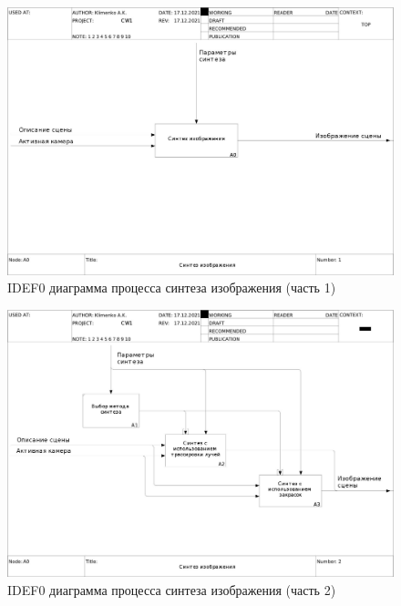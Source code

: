\begin{figure}[ht]
    \centering
    \includegraphics[width=\linewidth,height=0.85\textheight,keepaspectratio]{idef0/01_A0.jpg}
    \caption{IDEF0 диаграмма процесса синтеза изображения (часть 1)}
    \label{idef0:render:1}
\end{figure}

\begin{figure}
    \centering
    \includegraphics[width=\linewidth,height=0.85\textheight,keepaspectratio]{idef0/02_A0.jpg}
    \caption{IDEF0 диаграмма процесса синтеза изображения (часть 2)}
    \label{idef0:render:2}
\end{figure}

